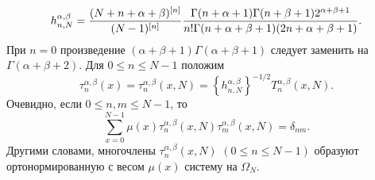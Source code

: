  \begin{equation}\label{siTpeq1.2.22.6}
h_{n,N}^{\alpha,\beta}={(N+n+\alpha+\beta)^{[n]}\over
(N-1)^{[n]}}{\Gamma(n+\alpha+1)\Gamma(n+\beta+1)
2^{\alpha+\beta+1}\over
n!\Gamma(n+\alpha+\beta+1)(2n+\alpha+\beta+1)}.
\end{equation}
 При $n=0$  произведение $(\alpha+\beta+1)\Gamma(\alpha+ \beta+1)$
следует заменить на $\Gamma(\alpha+\beta+2)$. Для $0\le n\le N-1$
положим
 \begin{equation}\label{siTpeq1.2.22.7}
  \tau_n^{\alpha,\beta}(x)=\tau_n^{\alpha,\beta}(x,N)=
\left\{h_{n,N}^{\alpha,\beta}\right\}^{-1/2}
T_n^{\alpha,\beta}(x,N).
\end{equation}
 Очевидно, если $0\le n,m\le
N-1$, то
\begin{equation}\label{siTpeq1.2.22.8} \sum_{x=0}^{N-1}\mu(x)\tau_n^{\alpha,\beta}(x,N)
\tau_m^{\alpha,\beta}(x,N)=\delta_{nm}.
\end{equation}
Другими словами, многочлены $\tau_n^{\alpha,\beta}(x,N)$ $(0\le n\le N-1)$
образуют ортонормированную с весом $\mu(x)$ систему на
$\Omega_N$.

